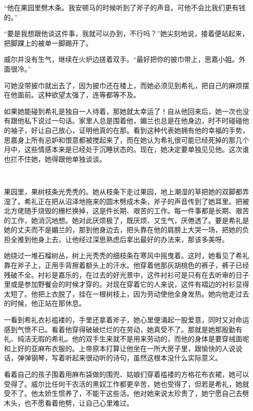 \par “他在果园里劈木条。我安顿马的时候听到了斧子的声音。可他不会比我们更有钱的。”
\par “要是我想跟他谈这件事，我就可以办到，不行吗？”她尖刻地说，接着便站起来，把脚踝上的被单一脚踢开了。
\par 威尔并没有生气，继续在火炉边搓着双手。“最好把你的披巾带上，思嘉小姐。外面很冷。”
\par 可她没带披巾就出去了，因为披巾还在楼上，而她必须见到希礼，把自己的麻烦摆在他面前。这种欲望太强了，连等都等不及。
\par 如果她能碰到希礼是独自一人待着，那她就太幸运了！自从他回来后，她一次也没有跟他私下说过一句话。家里人总是围着他，媚兰也总是在他身边，时不时碰碰他的袖子，好让自己放心，证明他真的在那。看到这种代表她拥有他的幸福的手势，思嘉身上所有忌妒和恨意都被搅起来了，而在她认为希礼很可能已经死掉的那几个月中，这些情感本来是已经处于沉睡状态的。现在，她决定要单独见见他。这次谁也拦不住她，她得跟他单独谈谈。
\par  
\par 果园里，果树枝条光秃秃的。她从枝条下走过果园，地上潮湿的草把她的双脚都弄湿了。希礼正在把从沼泽地拖来的圆木劈成木条，斧子的声音传到了她耳里。把被北方佬随手烧毁的栅栏换掉，这是件长期、艰苦的工作。每一件事都是长期、艰苦的工作，她消沉地想。她对此厌烦极了，既厌烦、又生气，厌倦透了。要是希礼是她的丈夫而不是媚兰的，那到他身边去，把头靠在他的肩膀上大哭一场，把她的负担全推到他身上去，让他经过深思熟虑后拿出最好的办法来，那该多美呀。
\par 她绕过一堆石榴树丛，树上光秃秃的细枝条在寒风中摇曳着。这时，她看见了希礼靠在斧子上，正用手背擦着额头上的汗水。他穿着他那灰胡桃色的裤子，裤子已经残破不全。衬衫是嘉乐的，在过去的好光景中，这件衬衫可是只有在去听审的日子里或是参加野餐会的时候才穿的。对现在穿着它的人来说，这件有褶边的衬衫显得太短了。他把上衣脱了，挂在一根树枝上，因为劳动使他全身发热。她向他走过去的时候，他正站在那休息。
\par 一看到希礼衣衫褴褛的，手里还拿着斧子，她心里便涌起一股爱意，同时又对命运感到气愤不已。看着他穿得破破烂烂的在劳动，她真受不了。那就是她那殷勤有礼、纯洁无瑕的希礼。他的双手生来就不是用来劳动的，而他的身体是要穿绒面呢和上好的亚麻布衣服的。上帝原本打算让他坐在一所大房子里，跟愉快的人说说话，弹弹钢琴，写着听起来很动听的诗句，虽然这根本没什么实际意义。
\par 看着自己的孩子围着用麻布袋做的围兜、姑娘们穿着褴褛的方格花布衣裙，她可以受得了。威尔比任何干农活的黑奴工作都更辛苦，她也受得了，但若是希礼，她就受不了。他太娇生惯养了，不能干这些活。他对她来说太珍贵了，她宁愿自己去劈木头，也不愿看着他劈，让自己心里难过。
